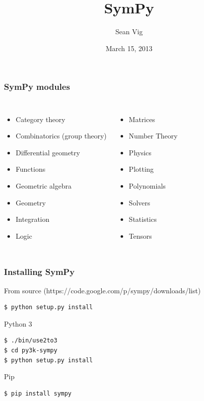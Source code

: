 \documentclass{beamer}
\title{SymPy}
\author{Sean Vig}
\date{March 15, 2013}
\begin{document}
\maketitle
\begin{frame}
  \frametitle{SymPy modules}
  \begin{columns}
    \begin{itemize}
      \item Category theory
      \item Combinatorics (group theory)
      \item Differential geometry
      \item Functions
      \item Geometric algebra
      \item Geometry
      \item Integration
      \item Logic
    \end{itemize}
    \begin{itemize}
      \item Matrices
      \item Number Theory
      \item Physics
      \item Plotting
      \item Polynomials
      \item Solvers
      \item Statistics
      \item Tensors
    \end{itemize}
  \end{columns}
\end{frame}

\begin{frame}[fragile]
  \frametitle{Installing SymPy}
  From source (https://code.google.com/p/sympy/downloads/list)
  \begin{exampleblock}{}
    \begin{verbatim}$ python setup.py install\end{verbatim}
  \end{exampleblock}
  Python 3
  \begin{exampleblock}{}
    \begin{verbatim}$ ./bin/use2to3
$ cd py3k-sympy
$ python setup.py install\end{verbatim}
  \end{exampleblock}
  Pip
  \begin{exampleblock}{}
    \begin{verbatim}$ pip install sympy\end{verbatim}
  \end{exampleblock}
\end{frame}
\end{document}
